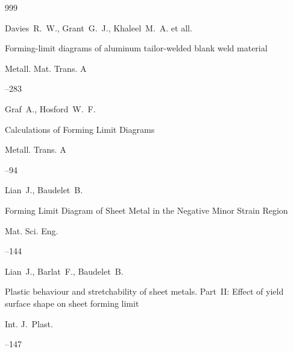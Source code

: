 \begin{thebibliography}{999}

\by Davies~R.~W., Grant~G.~J., Khaleel~M.~A. et all.

\paper Forming-limit diagrams of aluminum tailor-welded blank weld material

\jour Metall. Mat. Trans. A




–283






\by Graf~A., Hosford~W.~F. 

\paper Calculations of Forming Limit Diagrams

\jour Metall. Trans. A




–94






\by Lian~J., Baudelet~B. 

\paper Forming Limit Diagram of Sheet Metal in the Negative Minor Strain Region

\jour Mat. Sci. Eng. 



--144





\by Lian~J., Barlat~F., Baudelet~B. 

\paper Plastic behaviour and stretchability of sheet metals. Part~II: Effect of yield surface shape on sheet forming limit

\jour Int. J.~Plast.  




--147



\end{thebibliography}

